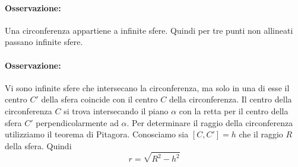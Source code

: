 \paragraph{Osservazione:} Una circonferenza appartiene a infinite sfere. Quindi per tre punti non allineati passano infinite sfere.

\paragraph{Osservazione:} Vi sono infinite sfere che intersecano la circonferenza, ma solo in una di esse il centro \(C'\) della sfera coincide con il centro \(C\) della circonferenza.
Il centro della circonferenza \(C\) si trova intersecando il piano \(\alpha \) con la retta per il centro della sfera \(C'\) perpendicolarmente ad \(\alpha \). Per determinare il raggio della circonferenza utilizziamo il teorema di Pitagora. Conosciamo sia \([C,C'] = h\) che il raggio \(R\) della sfera. Quindi \[
    r = \sqrt{R^{2} - h^{2}}
\]
\begin{figure}[ht]
    \centering
    \def\svgwidth{130pt}
    \label{fig:circonferenza-tridimensionale}
\end{figure}

